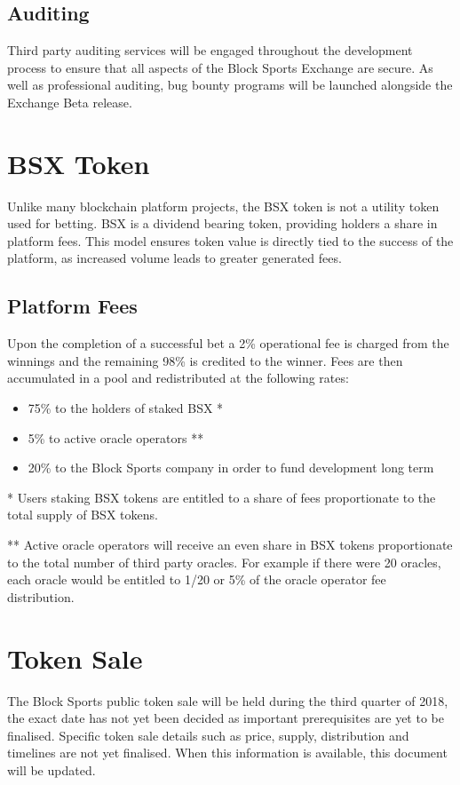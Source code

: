 \documentclass{article}
\begin{document}
	\subsection{Auditing}
Third party auditing services will be engaged throughout the development process to ensure that all aspects of the Block Sports Exchange are secure. As well as professional auditing,
bug bounty programs will be launched alongside the Exchange Beta release.

\section{BSX Token}

Unlike many blockchain platform projects, the BSX token is not a utility token used for betting. BSX is a dividend bearing token, providing holders a share in platform fees. This model ensures token value is directly tied to the success of the platform, as increased volume leads to greater generated fees.

	\subsection{Platform Fees}
Upon the completion of a successful bet a 2\% operational fee is charged from the winnings and the remaining 98\% is credited to the winner. Fees are then accumulated in a pool and redistributed at the following rates:

\begin{itemize}
	\item 75\% to the holders of staked BSX *
	\item 5\% to active oracle operators **
	\item 20\% to the Block Sports company in order to fund development long term

\end{itemize}

* Users staking BSX tokens are entitled to a share of fees proportionate to the total supply of BSX tokens.

** Active oracle operators will receive an even share in BSX tokens proportionate to the total number of third party oracles. For example if there were 20 oracles, each oracle would be entitled to 1/20 or 5\% of the oracle operator fee distribution.

\section{Token Sale}
The Block Sports public token sale will be held during the third quarter of 2018, the exact date has not yet been decided as important prerequisites are yet to be finalised. Specific token sale details such as price, supply, distribution and timelines are not yet finalised. When this information is available, this document will be updated.
\end{document}

